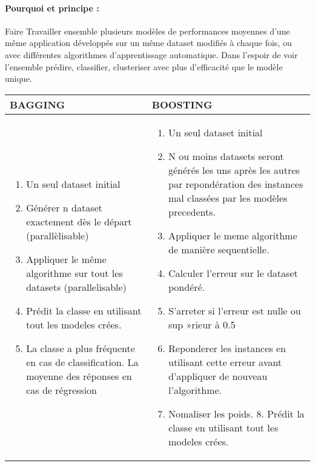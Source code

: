 \documentclass[a4paper, 12pt]{article}
\begin{document}
	\paragraph{Pourquoi et principe : } Faire  Travailler ensemble plusieurs modèles de performances moyennes d’une même application développés sur un même dataset modifiés à chaque fois, ou avec différentes algorithmes d’apprentissage automatique. Dans l’espoir de voir l’ensemble prédire, classifier, clusteriser avec plus d’efficacité que le modèle unique.
		\centering
	\begin{tabular}{|>{\raggedright\arraybackslash}p{6cm}|>{\raggedright\arraybackslash}p{6cm}|}
		\hline \rowcolor{cyan} \textbf{{ BAGGING }} & \textbf{{ BOOSTING }}\\ \hline
		\begin{enumerate}
			\item \justifying  Un seul dataset initial   
			\item \justifying  Générer n dataset exactement dès le départ (parallèlisable)
			\item \justifying  Appliquer le même algorithme sur tout les datasets (parallelisable)
			\item \justifying  Prédit la classe en utilisant tout les modeles crées.
			\item \justifying  La classe a plus fréquente en cas de classification. La moyenne des réponses en cas de régression
		\end{enumerate}
		& \begin{enumerate}
			\item \justifying  Un seul dataset initial  
			\item \justifying  N ou moins datasets seront générés les uns après les autres par repondération des instances mal classées par les modèles precedents.
			\item \justifying  Appliquer le meme algorithme de manière sequentielle.
			\item \justifying  Calculer l’erreur sur le dataset pondéré.
			\item \justifying  S’arreter si l’erreur est nulle ou sup »rieur à 0.5 
			\item \justifying  Reponderer les instances en utilisant cette erreur avant d’appliquer de nouveau l’algorithme.
			\item \justifying  Nomaliser les poids. 8. Prédit la classe en utilisant tout les modeles crées.

		\end{enumerate}
		\\
		\hline
	\end{tabular}
\end{document}
